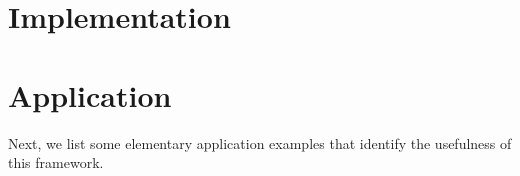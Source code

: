 \documentclass[sigconf,preprint]{acmart}
\begin{document}






% 

%















\section{Implementation}






















%

%

\section{Application}

Next, we list some elementary application examples that identify the
usefulness of this framework.









% 









%
\end{document}
